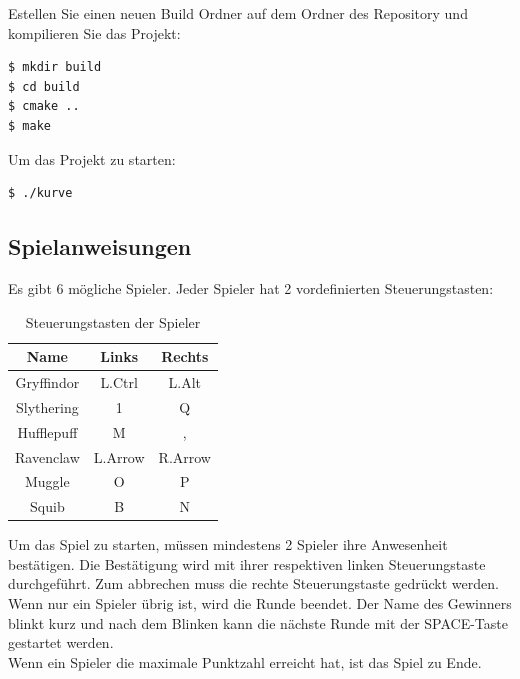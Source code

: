 \documentclass[doktyp=studarbeit]{TUBAFarbeiten}
\begin{document}
Estellen Sie einen neuen Build Ordner auf dem Ordner des Repository und 
kompilieren Sie das Projekt:
\begin{lstlisting}[language=bash]
$ mkdir build
$ cd build
$ cmake ..
$ make
\end{lstlisting}

Um das Projekt zu starten:
\begin{lstlisting}[language=bash]
$ ./kurve
\end{lstlisting}

\FloatBarrier
\subsection{Spielanweisungen}

Es gibt 6 mögliche Spieler. Jeder Spieler hat 2 vordefinierten Steuerungstasten:

\begin{table}
    \centering
    \begin{tabular}{ |c|c|c| }
        \hline
        Name & Links & Rechts \\
        \hline
        Gryffindor & L.Ctrl  & L.Alt \\
        Slythering & 1       & Q \\
        Hufflepuff & M       & , \\
        Ravenclaw  & L.Arrow & R.Arrow \\
        Muggle     & O       & P \\
        Squib      & B       & N \\
        \hline
    \end{tabular}
    \caption{Steuerungstasten der Spieler}
\end{table}

\FloatBarrier
Um das Spiel zu starten, müssen mindestens 2 Spieler ihre Anwesenheit 
bestätigen. Die Bestätigung wird mit ihrer respektiven linken
Steuerungstaste durchgeführt. Zum abbrechen muss die rechte Steuerungstaste 
gedrückt werden. \\

Wenn nur ein Spieler übrig ist, wird die Runde beendet. Der Name des Gewinners
blinkt kurz und nach dem Blinken kann die nächste Runde mit der 
SPACE-Taste gestartet werden. \\

Wenn ein Spieler die maximale Punktzahl erreicht hat, ist das Spiel zu Ende.

\printbibliography[heading=bibintoc]

\newpage
\appendix
\end{document}
